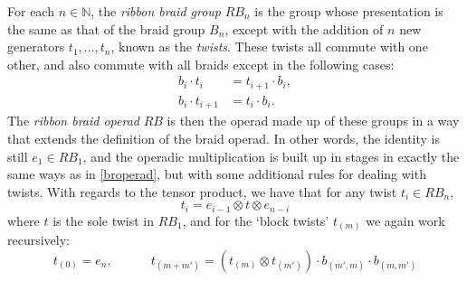 \documentclass{amsbook} %
\numberwithin{section}{chapter}
\begin{document}
\begin{Defi} For each $n \in \mathbb{N}$, the \emph{ribbon braid group} $RB_{n}$ is the group whose presentation is the same as that of the braid group $B_{n}$, except with the addition of $n$ new generators $t_1, \ldots, t_n$, known as the \emph{twists}. These twists all commute with one other, and also commute with all braids except in the following cases:
  \begin{align*}
    b_i \cdot t_i &= t_{i+1} \cdot b_i,\\
    b_i \cdot t_{i+1} &= t_i \cdot b_i.
  \end{align*}
The \emph{ribbon braid operad} $RB$ is then the operad made up of these groups in a way that extends the definition of the braid operad. In other words, the identity is still $e_1 \in RB_1$, and the operadic multiplication is built up in stages in exactly the same ways as in \cref{broperad}, but with some additional rules for dealing with twists. With regards to the tensor product, we have that for any twist $t_i \in RB_{n}$,
  \[
    t_i = e_{i-1} \otimes t \otimes e_{n-i}
  \]
where $t$ is the sole twist in $RB_1$, and for the `block twists' $t_{(m)}$ we again work recursively:
  \[
    t_{(0)} = e_n, \quad \quad \quad t_{(m+m')} = \left(t_{(m)} \otimes t_{(m')}\right) \cdot b_{(m', m)} \cdot b_{(m, m')}
  \]
\end{Defi}
\end{document}
